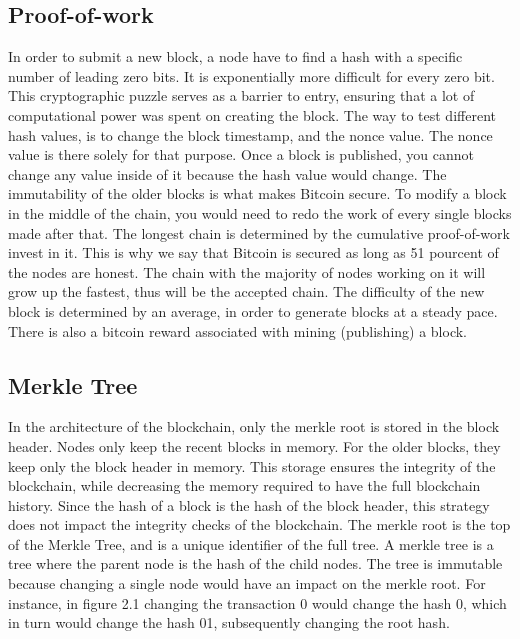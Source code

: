 \subsection{Proof-of-work}
In order to submit a new block, a node have to find a hash with a specific number of leading zero bits.
It is exponentially more difficult for every zero bit. 
This cryptographic puzzle serves as a barrier to entry, ensuring that a lot of computational power was spent on creating the block.
The way to test different hash values, is to change the block timestamp, and the nonce value.
The nonce value is there solely for that purpose. Once a block is published, you cannot change any value inside of it because the hash value would change.
The immutability of the older blocks is what makes Bitcoin secure. To modify a block in the middle of the chain, you would need to redo the work of every single blocks made after that.
The longest chain is determined by the cumulative proof-of-work invest in it. This is why we say that Bitcoin is secured as long as 51 pourcent of the nodes are honest.
The chain with the majority of nodes working on it will grow up the fastest, thus will be the accepted chain.
The difficulty of the new block is determined by an average, in order to generate blocks at a steady pace. There is also a bitcoin reward associated with mining (publishing) a block.



\subsection{Merkle Tree}
In the architecture of the blockchain, only the merkle root is stored in the block header. Nodes only keep the recent blocks in memory. For the older blocks, they keep only the block header in memory.
This storage ensures the integrity of the blockchain, while decreasing the memory required to have the full blockchain history.
Since the hash of a block is the hash of the block header, this strategy does not impact the integrity checks of the blockchain.
The merkle root is the top of the Merkle Tree, and is a unique identifier of the full tree. A merkle tree is a tree where the parent node is the hash of the child nodes.
The tree is immutable because changing a single node would have an impact on the merkle root. For instance, in figure 2.1 changing the transaction 0 would change the hash 0,
which in turn would change the hash 01, subsequently changing the root hash.

